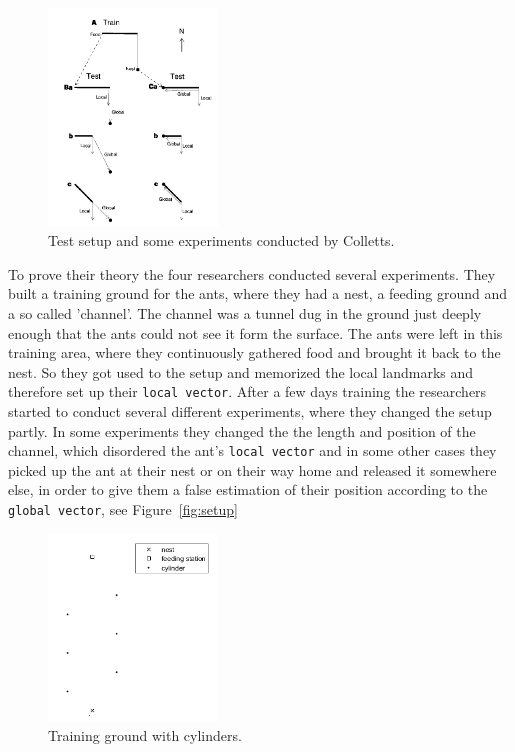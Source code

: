 \documentclass[11pt]{article}
\begin{document}
\begin{figure}[H]
	\centering
	\includegraphics[width=0.4\textwidth]{experiments_setup.png}
	\caption{Test setup and some experiments conducted by Colletts. \cite{wehner}}
	\label{fig:setup}
\end{figure}

		To prove their theory the four researchers conducted several experiments. They built a training ground for the ants, where they had a nest, a feeding ground and a so called 'channel'. The channel was a tunnel dug in the ground just deeply enough that the ants could not see it form the surface. The ants were left in this training area, where they continuously gathered food and brought it back to the nest. So they got used to the setup and memorized the local landmarks and therefore set up their \texttt{local vector}. After a few days training the researchers started to conduct several different experiments, where they changed the setup partly. In some experiments they changed the the length and position of the channel, which disordered the ant's \texttt{local vector} and in some other cases they picked up the ant at their nest or on their way home and released it somewhere else, in order to give them a false estimation of their position according to the \texttt{global vector}, see Figure~\vref{fig:setup}


\begin{figure}[H]
	\centering
	\includegraphics[width=0.4\textwidth]{cylinders.png}
	\caption{Training ground with cylinders.}
	\label{fig:cylinders}
\end{figure}
\end{document}
